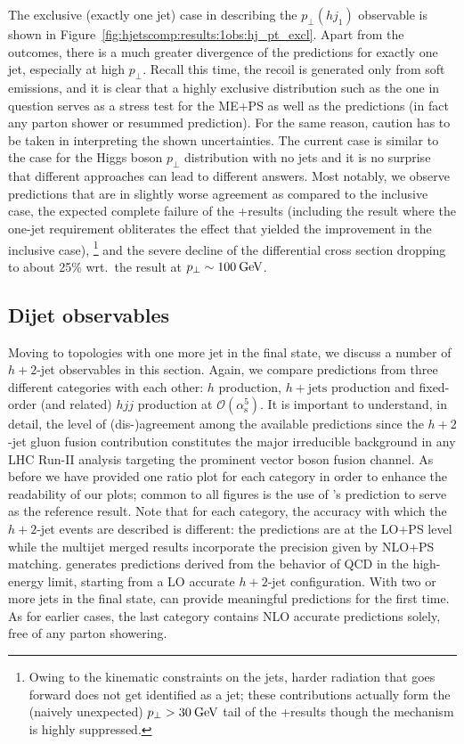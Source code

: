 The exclusive (exactly one jet) case in describing the $p_\perp(hj_1)$
observable is shown in Figure~\ref{fig:hjetscomp:results:1obs:hj_pt_excl}.
Apart from the \NNLOPS outcomes, there is a much greater divergence of
the predictions for exactly one jet, especially at high $p_\perp$.
Recall this time, the recoil is generated only from soft emissions, and
it is clear that a highly exclusive distribution such as the one in
question serves as a stress test for the ME+PS as well as the \NNLOPS
predictions (in fact any parton shower or resummed prediction). For
the same reason, caution has to be taken in interpreting the shown
uncertainties. The current case is similar to the case for the Higgs
boson $p_\perp$ distribution with no jets and it is no surprise that
different approaches can lead to different answers. Most notably, we
observe \NNLOPS predictions that are in slightly worse agreement as
compared to the inclusive case, the expected complete failure of the
\GoSam{}+\Sherpa results (including the \Loopsim result where the
one-jet requirement obliterates the effect that yielded the
improvement in the inclusive case),%
\footnote{Owing to the kinematic constraints on the jets, harder
  radiation that goes forward does not get identified as a jet;
  these contributions actually form the (naively unexpected)
  $p_\perp>30\text{\:GeV}$ tail of the \GoSam{}+\Sherpa results though the mechanism is
  highly suppressed.}
and the severe decline of the \Herwig differential cross section
dropping to about 25\% wrt.~the \Powheg result at $p_\perp\sim100\text{\:GeV}$.



\subsection{Dijet observables}
\label{sec:hjetscomp:results:2jobs}

Moving to topologies with one more jet in the final state, 
we discuss a number of $h+2$-jet
observables in this section. Again, we compare predictions from three
different categories with each other: \NNLOPS $h$ production,
\MEPSatNLO $h+\text{jets}$ production and fixed-order (and related)
$hjj$ production at $\mathcal{O}(\alpha_\mathrm{s}^5)$. It is important
to understand, in detail, the level of (dis-)agreement among the
available predictions since the $h+2$-jet gluon fusion contribution
constitutes the major irreducible background in any LHC Run-II analysis
targeting the prominent vector boson fusion channel. As before we have
provided one ratio plot for each category in order to enhance the
readability of our plots; common to all figures is the use of \Powheg's
\NNLOPS prediction to serve as the reference result. Note that for
each category, the accuracy with which the $h+2$-jet events are
described is different: the \NNLOPS predictions are at the LO+PS level
while the multijet merged results incorporate the precision given by NLO+PS
matching. \Hej generates predictions derived from the behavior of QCD
in the high-energy limit, starting from a LO accurate $h+2$-jet configuration.
With two or more jets in the final state,
\Hej can provide meaningful predictions for the first time. As
for earlier cases, the last category contains NLO accurate predictions
solely, free of any parton showering.

